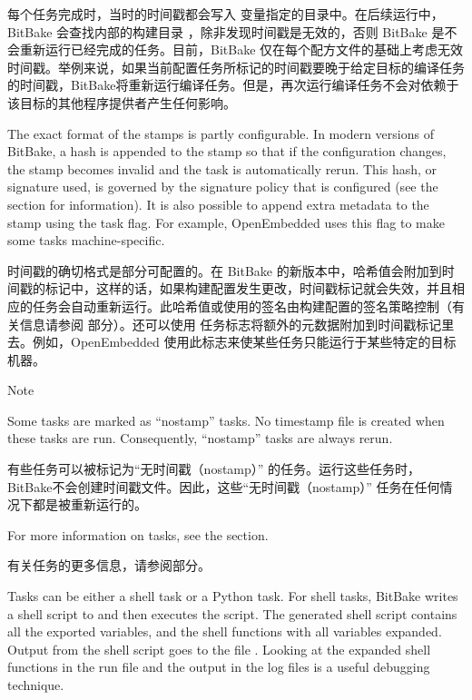 每个任务完成时，当时的时间戳都会写入  变量指定的目录中。在后续运行中，BitBake 会查找内部的构建目录 ，除非发现时间戳是无效的，否则 BitBake 是不会重新运行已经完成的任务。目前，BitBake 仅在每个配方文件的基础上考虑无效时间戳。举例来说，如果当前配置任务所标记的时间戳要晚于给定目标的编译任务的时间戳，BitBake将重新运行编译任务。但是，再次运行编译任务不会对依赖于该目标的其他程序提供者产生任何影响。

The exact format of the stamps is partly configurable. In modern versions of BitBake, a hash is appended to the stamp so that if the configuration changes, the stamp becomes invalid and the task is automatically rerun. This hash, or signature used, is governed by the signature policy that is configured (see the  section for information). It is also possible to append extra metadata to the stamp using the  task flag. For example, OpenEmbedded uses this flag to make some tasks machine-specific.

时间戳的确切格式是部分可配置的。在 BitBake 的新版本中，哈希值会附加到时间戳的标记中，这样的话，如果构建配置发生更改，时间戳标记就会失效，并且相应的任务会自动重新运行。此哈希值或使用的签名由构建配置的签名策略控制（有关信息请参阅  部分）。还可以使用  任务标志将额外的元数据附加到时间戳标记里去。例如，OpenEmbedded 使用此标志来使某些任务只能运行于某些特定的目标机器。

\begin{noteblock}{Note}%

Some tasks are marked as ``nostamp'' tasks. No timestamp file is created when these tasks are run. Consequently, ``nostamp'' tasks are always rerun.

\medskip
有些任务可以被标记为``无时间戳（nostamp）'' 的任务。运行这些任务时，BitBake不会创建时间戳文件。因此，这些``无时间戳（nostamp）'' 任务在任何情况下都是被重新运行的。
\end{noteblock}

For more information on tasks, see the  section.

有关任务的更多信息，请参阅部分。

\label{section:Executing Tasks}

Tasks can be either a shell task or a Python task. For shell tasks, BitBake writes a shell script to \footnotemark[1] and then executes the script. The generated shell script contains all the exported variables, and the shell functions with all variables expanded. Output from the shell script goes to the file \footnotemark[1]. Looking at the expanded shell functions in the run file and the output in the log files is a useful debugging technique.

